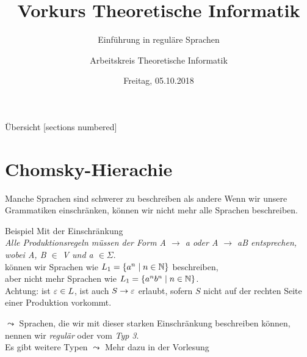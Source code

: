 

\title{Vorkurs Theoretische Informatik}
\subtitle{Einführung in reguläre Sprachen}
\date{Freitag, 05.10.2018}
\author{Arbeitskreis Theoretische Informatik}



\maketitle

\begin{frame}[fragile]{Übersicht}
  [sections numbered]
  \tableofcontents%
\end{frame}


\section{Chomsky-Hierachie}

\begin{frame}[fragile]{Manche Sprachen sind schwerer zu beschreiben als andere}
    Wenn wir unsere Grammatiken einschränken, können wir nicht mehr alle Sprachen beschreiben.
    \begin{exampleblock}{Beispiel}
        Mit der Einschränkung\\
        \emph{Alle Produktionsregeln müssen der Form \alert{A $\to$ a oder A $\to$ aB} entsprechen, wobei A, B $\in$ V und a $\in \Sigma$}.\\
        können wir Sprachen wie $L_1 = \{a^n \mid n \in \mathbb{N}\}$ beschreiben,\\ aber nicht mehr Sprachen wie $L_1 = \{a^nb^n \mid n \in \mathbb{N}\}$.\\
        \alert{Achtung:} ist $\varepsilon \in L$, ist auch $S\to\varepsilon$ erlaubt, sofern $S$ nicht auf der rechten Seite einer Produktion vorkommt.
    \end{exampleblock}
    $\leadsto$ Sprachen, die wir mit dieser starken Einschränkung beschreiben können, nennen wir \alert{\emph{regulär}} oder vom \alert{\emph{Typ 3}}.\\
    Es gibt weitere Typen $\leadsto$ Mehr dazu in der Vorlesung
\end{frame}

